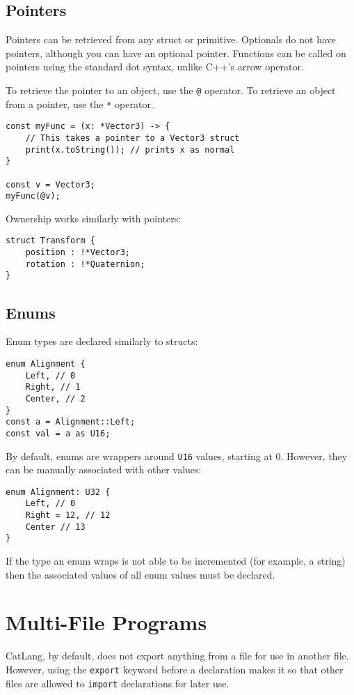 \documentclass[12pt]{article}
\begin{document}
\subsection{Pointers}

Pointers can be retrieved from any struct or primitive. Optionals do not have pointers, although you can have an optional pointer. Functions can be called on pointers using the standard dot syntax, unlike C++'s arrow operator.

To retrieve the pointer to an object, use the \lstinline!@! operator. To retrieve an object from a pointer, use the \lstinline!*! operator.

\begin{lstlisting}
const myFunc = (x: *Vector3) -> {
	// This takes a pointer to a Vector3 struct
	print(x.toString()); // prints x as normal
}

const v = Vector3;
myFunc(@v);
\end{lstlisting}

Ownership works similarly with pointers:

\begin{lstlisting}
struct Transform {
	position : !*Vector3;
	rotation : !*Quaternion;
}
\end{lstlisting}

\subsection{Enums}

Enum types are declared similarly to structs:

\begin{lstlisting}
enum Alignment {
	Left, // 0
	Right, // 1
	Center, // 2
}
const a = Alignment::Left;
const val = a as U16;
\end{lstlisting}

By default, enums are wrappers around \lstinline!U16! values, starting at 0. However, they can be manually associated with other values:

\begin{lstlisting}
enum Alignment: U32 {
	Left, // 0
	Right = 12, // 12
	Center // 13
}
\end{lstlisting}

If the type an enum wraps is not able to be incremented (for example, a string) then the associated values of all enum values must be declared.

\section{Multi-File Programs}
CatLang, by default, does not export anything from a file for use in another file. However, using the \lstinline!export! keyword before a declaration makes it so that other files are allowed to \lstinline!import! declarations for later use.
\end{document}

